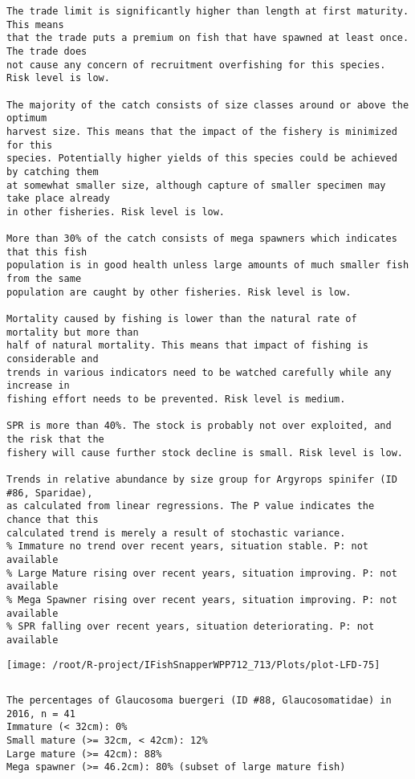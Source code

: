 \documentclass{report}\usepackage[]{graphicx}\usepackage[]{color}
\makeatletter
\def\maxwidth{ %
  \ifdim\Gin@nat@width>\linewidth
    \linewidth
  \else
    \Gin@nat@width
  \fi
}
\newenvironment{kframe}{%
 \def\at@end@of@kframe{}%
 \ifinner\ifhmode%
  \def\at@end@of@kframe{\end{minipage}}%
  \begin{minipage}{\columnwidth}%
 \fi\fi%
 \def\FrameCommand##1{\hskip\@totalleftmargin \hskip-\fboxsep
 \colorbox{shadecolor}{##1}\hskip-\fboxsep
     \hskip-\linewidth \hskip-\@totalleftmargin \hskip\columnwidth}%
 \MakeFramed {\advance\hsize-\width
   \@totalleftmargin\z@ \linewidth\hsize
   \@setminipage}}%
 {\par\unskip\endMakeFramed%
 \at@end@of@kframe}
\newenvironment{knitrout}{}{} %
\makeatother
\begin{document}
\begin{knitrout}
\begin{kframe}
\begin{verbatim}
The trade limit is significantly higher than length at first maturity.  This means
that the trade puts a premium on fish that have spawned at least once. The trade does
not cause any concern of recruitment overfishing for this species. Risk level is low.

The majority of the catch consists of size classes around or above the optimum
harvest size. This means that the impact of the fishery is minimized for this
species. Potentially higher yields of this species could be achieved by catching them
at somewhat smaller size, although capture of smaller specimen may take place already
in other fisheries. Risk level is low.

More than 30% of the catch consists of mega spawners which indicates that this fish
population is in good health unless large amounts of much smaller fish from the same
population are caught by other fisheries. Risk level is low.
 
Mortality caused by fishing is lower than the natural rate of mortality but more than
half of natural mortality. This means that impact of fishing is considerable and
trends in various indicators need to be watched carefully while any increase in
fishing effort needs to be prevented. Risk level is medium.
 
SPR is more than 40%. The stock is probably not over exploited, and the risk that the
fishery will cause further stock decline is small. Risk level is low.
 
Trends in relative abundance by size group for Argyrops spinifer (ID #86, Sparidae),
as calculated from linear regressions. The P value indicates the chance that this
calculated trend is merely a result of stochastic variance.
% Immature no trend over recent years, situation stable. P: not available
% Large Mature rising over recent years, situation improving. P: not available
% Mega Spawner rising over recent years, situation improving. P: not available
% SPR falling over recent years, situation deteriorating. P: not available
\end{verbatim}
\end{kframe}
\texttt{[image: /root/R-project/IFishSnapperWPP712\_713/Plots/plot-LFD-75]} 
\begin{kframe}\begin{verbatim}
\end{verbatim}
\end{kframe}
\clearpage
\newpage
\begin{kframe}\begin{verbatim}
The percentages of Glaucosoma buergeri (ID #88, Glaucosomatidae) in 2016, n = 41
Immature (< 32cm): 0%
Small mature (>= 32cm, < 42cm): 12%
Large mature (>= 42cm): 88%
Mega spawner (>= 46.2cm): 80% (subset of large mature fish)
 

\end{verbatim}
\end{kframe}
\end{knitrout}
\end{document}
